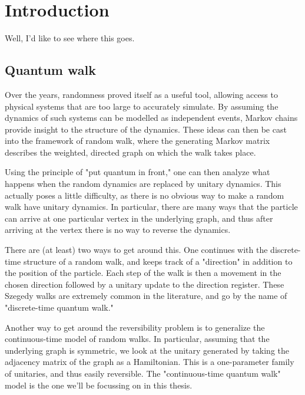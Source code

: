 \documentclass[../thesis-main/thesis-main]{subfiles}
\begin{document}
\chapter{Introduction}

Well, I'd like to see where this goes.





\section{Quantum walk}
Over the years, randomness proved itself as a useful tool, allowing access to physical systems that are too large to accurately simulate.  By assuming the dynamics of such systems can be modelled as independent events, Markov chains provide insight to the structure of the dynamics.  These ideas can then be cast into the framework of random walk, where the generating Markov matrix describes the weighted, directed graph on which the walk takes place.  

Using the principle of "put quantum in front," one can then analyze what happens when the random dynamics are replaced by unitary dynamics.  This actually poses a little difficulty, as there is no obvious way to make a random walk have unitary dynamics.  In particular, there are many ways that the particle can arrive at one particular vertex in the underlying graph, and thus after arriving at the vertex there is no way to reverse the dynamics.

There are (at least) two ways to get around this.  One continues with the discrete-time structure of a random walk, and keeps track of a "direction" in addition to the position of the particle.  Each step of the walk is then a movement in the chosen direction followed by a unitary update to the direction register.   These Szegedy walks are extremely common in the literature, and go by the name of "discrete-time quantum walk."

Another way to get around the reversibility problem is to generalize the continuous-time model of random walks.  In particular, assuming that the underlying graph is symmetric, we look at the unitary generated by taking the adjacency matrix of the graph as a Hamiltonian.  This is a one-parameter family of unitaries, and thus easily reversible.  The "continuous-time quantum walk" model is the one we'll be focussing on in this thesis.
\end{document}
